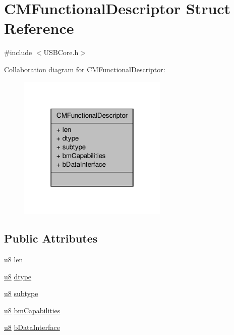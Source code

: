 \hypertarget{struct_c_m_functional_descriptor}{\section{C\-M\-Functional\-Descriptor Struct Reference}
\label{struct_c_m_functional_descriptor}
}


{\ttfamily \#include $<$U\-S\-B\-Core.\-h$>$}



Collaboration diagram for C\-M\-Functional\-Descriptor\-:
\nopagebreak
\begin{figure}[H]
\begin{center}
\leavevmode
\includegraphics[width=202pt]{struct_c_m_functional_descriptor__coll__graph}
\end{center}
\end{figure}
\subsection*{Public Attributes}
\begin{DoxyCompactItemize}
\item 
\hyperlink{_platform_8h_aed742c436da53c1080638ce6ef7d13de}{u8} \hyperlink{struct_c_m_functional_descriptor_ad1d12222b3392d7b522bb96b57150324}{len}
\item 
\hyperlink{_platform_8h_aed742c436da53c1080638ce6ef7d13de}{u8} \hyperlink{struct_c_m_functional_descriptor_ab76c402780d22b9410950a5a007f2d9c}{dtype}
\item 
\hyperlink{_platform_8h_aed742c436da53c1080638ce6ef7d13de}{u8} \hyperlink{struct_c_m_functional_descriptor_a07b6c7a42fb152c50eeee9f8e80b7552}{subtype}
\item 
\hyperlink{_platform_8h_aed742c436da53c1080638ce6ef7d13de}{u8} \hyperlink{struct_c_m_functional_descriptor_ab7e0bfe190791304ff4fdda9daa4c0bd}{bm\-Capabilities}
\item 
\hyperlink{_platform_8h_aed742c436da53c1080638ce6ef7d13de}{u8} \hyperlink{struct_c_m_functional_descriptor_aea53687b85e0c589de6923a53023e6a6}{b\-Data\-Interface}
\end{DoxyCompactItemize}


